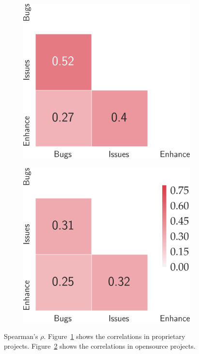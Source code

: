 \begin{figure}[t!]
	\centering
	\begin{subfigure}[t]{0.45\linewidth}
		\centering
		\includegraphics[width=0.99\linewidth]{images/RQ2/inhouse.png}
		\caption{}
		\label{rq2:a}
	\end{subfigure}
	\begin{subfigure}[t]{0.45\linewidth}
	\centering
	\includegraphics[width=\linewidth]{images/RQ2/opensrc.png}
		\caption{}	
		\label{rq2:b}	
	\end{subfigure}%
	\caption{Spearman's $\rho$. Figure~\ref{rq2:a} shows the correlations in 
	proprietary projects. Figure~\ref{rq2:b} shows the correlations in opensource 
	projects.}
	\label{fig:rq2}
\end{figure}
